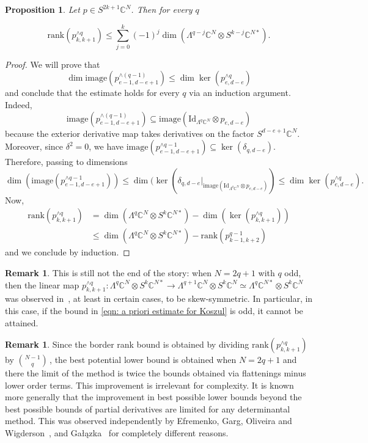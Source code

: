 \documentclass[11pt]{article}
\numberwithin{equation}{section}
\newtheorem{proposition}[theorem]{Proposition}
\theoremstyle{definition}
\newtheorem{remark}[theorem]{Remark}
\theoremstyle{plain}
\newcommand{\bbC}{\mathbb{C}}
\newcommand{\Id}{\mathrm{Id}}
\def\BC{\mathbb C}
\def\ww{\wedge}
\def\La#1{\Lambda^{#1}}
\def\tdim{\operatorname{dim}}
\def\trank{\mathrm{rank}}
\def\tim{\mathrm{image}}
\begin{document}
\begin{proposition}\label{kozapriori} Let $p\in S^{2k+1}\BC^N$. Then for every $q$

\begin{equation}\label{eqn: a priori estimate for Koszul}
\trank(p^{\ww q}_{k,k+1})\leq \sum_{j=0}^k (-1)^j\tdim ( \La{q-j}\BC^N \otimes S^{k-j}\BC^{N*}).
\end{equation}
\end{proposition}
\begin{proof}
We will prove that 
\[
\dim \tim (p^{\wedge(q-1)}_{e-1,d-e+1}) \leq \dim \ker (p^{\wedge q}_{e,d-e}) 
\]
and conclude that the estimate holds for every $q$ via an induction argument. Indeed,
\[
  \tim \left(p^{\wedge (q-1)}_{e-1,d-e+1}\right) \subseteq \tim (\Id_{\Lambda^{q} \bbC^N} \otimes p_{e,d-e})
\]
because the exterior derivative map takes derivatives on the factor
$S^{d-e+1} \bbC^N$. Moreover, since $\delta^2 = 0$, we have
$\tim (p^{\wedge q-1}_{e-1,d-e+1}) \subseteq
\ker(\delta_{q,d-e})$. Therefore, passing to dimensions
\[
\dim (\tim (p^{\wedge q-1}_{e-1,d-e+1})) \leq \dim ( \ker(\delta_{q,d-e} \vert_{\tim (\Id_{\Lambda^{q} \bbC^N} \otimes p_{e,d-e})}) \leq \dim \ker (p^{\wedge q}_{e,d-e}).
\]
Now,
\begin{align*} 
\trank(p^{\ww q}_{k,k+1}) &= \dim  (\La{q}\BC^N \otimes S^{k}\BC^{N*} ) - \dim (\ker (p^{\ww q}_{k,k+1}))   \\ 
  & \leq  \tdim (\La{q}\BC^N \otimes S^{k}\BC^{N*}) - \trank (p^{q-1}_{k-1,k+2}) 
\end{align*}
and we conclude by induction.
\end{proof}

\begin{remark}\label{rmk: skewsymmetric koszul}
This is still not the end of the story:  when $N=2q+1$ with $q$ odd, then the linear map $p^{\ww q}_{k,k+1}: \La q \BC^N \otimes  S^k\BC^{N*} \to \La{q+1}\BC^N  \otimes S^{k}\BC^N \simeq  \La{q}\BC^{N*} \otimes S^k\BC^N$ was observed in~\cite{MR3081636}, at least in certain cases, to be skew-symmetric. In particular, in this case,  if the bound in \eqref{eqn: a priori estimate for Koszul} is odd, it cannot be attained. 
\end{remark}

\begin{remark}
Since the border rank bound is obtained by dividing $\trank(p^{\ww q}_{k,k+1})$ by $\binom{N-1}q$\,, the best potential lower bound is obtained when $N=2q+1$ and there the limit of the method is   twice the bounds obtained via flattenings minus lower order terms. This improvement is irrelevant for complexity. It is known more generally that the improvement in best possible lower bounds beyond the best possible bounds of partial derivatives are limited for any determinantal method. This was observed independently by Efremenko, Garg, Oliveira and Wigderson~\cite{EfrGarOliWig:BarriersRankMethods}, and Ga{\l}\k{a}zka~\cite{2016arXiv160508005G} for completely different reasons.
\end{remark}
\end{document}
